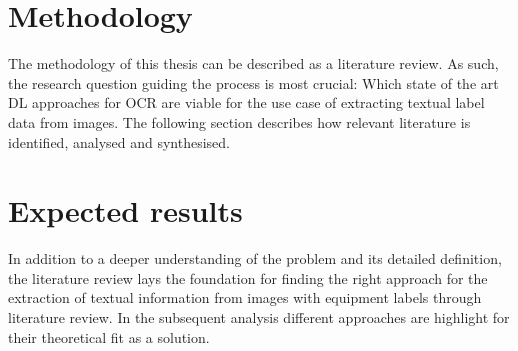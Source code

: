 \section{Methodology}\label{se:methodology}
The methodology of this thesis can be described as a literature review.
As such, the research question guiding the process is most crucial: Which state of the art \ac{DL}
approaches for \ac{OCR} are viable for the use case of extracting textual label data from
images.
The following section describes how relevant literature is identified, analysed and synthesised.

\begin{comment}
Add: how was problem defined
only after (incl.) 2017

Searching:
search strategy for specific review: $\rightarrow$ provide reasoning behind choices
\begin{itemize}
    \item search tearms
    \item databases
    \item inclusion \& exclusion criteria: year of publification, type of article, journal, research
        quality
\end{itemize}
write all decisions down, how is search documented
The research is then extended to existing practical solutions for similar practical problems as
well as proposed architectures from academic research.
Documentation of search process and selection, asses quality of search process and selection

Analysis:
how is data prepared for analysis
analyse problem: find requirements
type of information that needs to be extracted: what works, why, not necesseraly how
literature review (state of the art)
how? top journals of last few years
Theoretical knowledge about the models as well as practical information about results for

Synthesis

after review:
discuss different approchoaches pros and cons for problem
methodogical limitations: practice is always different, \ldots
\end{comment}

\section{Expected results}
In addition to a deeper understanding of the problem and its detailed definition, the literature
review lays the foundation for finding the right approach for the extraction of textual
information from images with equipment labels through literature review.
In the subsequent analysis different approaches are highlight for their theoretical fit as a solution.

